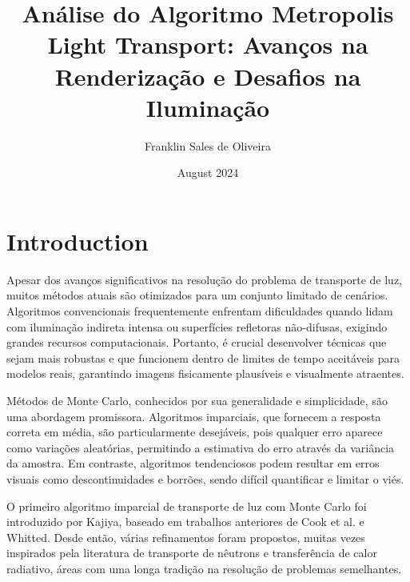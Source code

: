 \documentclass{article}
\title{Análise do Algoritmo Metropolis Light Transport: Avanços na Renderização e Desafios na Iluminação}
\author{Franklin Sales de Oliveira}
\date{August 2024}
\begin{document}
\maketitle

\section{Introduction}

Apesar dos avanços significativos na resolução do problema de transporte de luz, muitos métodos atuais são otimizados para um conjunto limitado de cenários. Algoritmos convencionais frequentemente enfrentam dificuldades quando lidam com iluminação indireta intensa ou superfícies refletoras não-difusas, exigindo grandes recursos computacionais. Portanto, é crucial desenvolver técnicas que sejam mais robustas e que funcionem dentro de limites de tempo aceitáveis para modelos reais, garantindo imagens fisicamente plausíveis e visualmente atraentes.

Métodos de Monte Carlo, conhecidos por sua generalidade e simplicidade, são uma abordagem promissora. Algoritmos imparciais, que fornecem a resposta correta em média, são particularmente desejáveis, pois qualquer erro aparece como variações aleatórias, permitindo a estimativa do erro através da variância da amostra. Em contraste, algoritmos tendenciosos podem resultar em erros visuais como descontinuidades e borrões, sendo difícil quantificar e limitar o viés.

O primeiro algoritmo imparcial de transporte de luz com Monte Carlo foi introduzido por Kajiya, baseado em trabalhos anteriores de Cook et al. e Whitted. Desde então, várias refinamentos foram propostos, muitas vezes inspirados pela literatura de transporte de nêutrons e transferência de calor radiativo, áreas com uma longa tradição na resolução de problemas semelhantes.
\end{document}

